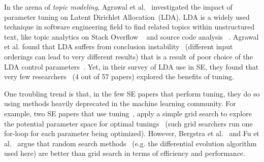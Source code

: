 \documentclass[sigconf,review, anonymous]{acmart}
\theoremstyle{break}
\newcommand{\bi}{\begin{itemize}[leftmargin=0.4cm]}
\newcommand{\ei}{\end{itemize}}
\begin{document}
In the arena of {\em topic modeling}, Agrawal et al.~\cite{agrawal2016wrong} investigated 
the impact of parameter tuning on Latent Dirichlet Allocation~(LDA).
LDA 
  is a widely used technique in software engineering field
to find related topics within unstructured text, 
like topic analytics on Stack Overflow ~\cite{barua2014developers}
and source code analysis ~\cite{binkley2014understanding}.
 Agrawal et al. found that LDA suffers from conclusion instability
~(different input orderings can lead to very different results)
that is a result of poor choice of the LDA control parameters~\cite{agrawal2016wrong}. 
Yet, in their survey of LDA use in SE, they found that very few  
researchers ~(4 out of 57 papers) explored the benefits of tuning.

One troubling trend is that, in the few SE papers that perform tuning,
they do so using methods heavily deprecated in the machine learning community.
For example, two SE papers that use tuning~\cite{lessmann2008benchmarking,tantithamthavorn2016automated}, 
apply a simple grid search to explore the potential parameter space for optimal tunings
~(such grid searchers run one for-loop for each parameter being optimized). 
However, Bergstra et al.~\cite{bergstra2012random} and 
Fu et al.~\cite{fu2016differential} argue that random search methods
~(e.g. the 
differential evolution algorithm used here) are better than 
grid search in terms of efficiency and performance.

\end{document}

